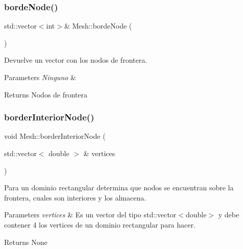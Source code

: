 \subsubsection{\texorpdfstring{borde\+Node()}{bordeNode()}}
{\footnotesize\ttfamily std\+::vector$<$int$>$\& Mesh\+::borde\+Node (\begin{DoxyParamCaption}{ }\end{DoxyParamCaption})\hspace{0.3cm}{\ttfamily [inline]}}



Devuelve un vector con los nodos de frontera. 


\begin{DoxyParams}{Parameters}
{\em Ninguno} & \\
\hline
\end{DoxyParams}
\begin{DoxyReturn}{Returns}
Nodos de frontera 
\end{DoxyReturn}
\hypertarget{class_mesh_a8da1c7918301eaf9f6c71979247d2d94}{}\label{class_mesh_a8da1c7918301eaf9f6c71979247d2d94} 
\subsubsection{\texorpdfstring{border\+Interior\+Node()}{borderInteriorNode()}}
{\footnotesize\ttfamily void Mesh\+::border\+Interior\+Node (\begin{DoxyParamCaption}\item[{std\+::vector$<$ double $>$ \&}]{vertices }\end{DoxyParamCaption})}



Para un dominio rectangular determina que nodos se encuentran sobre la frontera, cuales son interiores y los almacena. 


\begin{DoxyParams}{Parameters}
{\em vertices} & Es un vector del tipo std\+::vector$<$double$>$ y debe contener 4 los vertices de un dominio rectangular para hacer. \\
\hline
\end{DoxyParams}
\begin{DoxyReturn}{Returns}
None 
\end{DoxyReturn}
\hypertarget{class_mesh_a7fcfd56c6f730879f51ff07153091f91}{}\label{class_mesh_a7fcfd56c6f730879f51ff07153091f91} 
